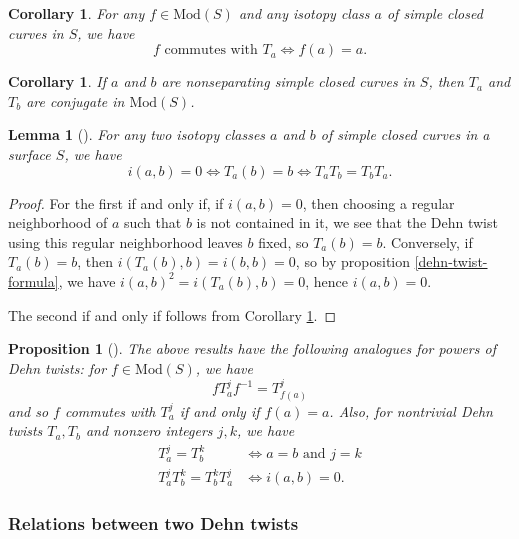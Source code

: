 \documentclass[reqno]{amsart}
\newtheorem{lemma}[theorem]{Lemma}
\newtheorem{proposition}[theorem]{Proposition}
\newtheorem{corollary}[theorem]{Corollary}
\theoremstyle{definition}
\theoremstyle{remark}
\newcommand{\Mod}{{\mathrm{Mod}}}
\begin{document}
\begin{corollary}\label{dehn-commute}
    For any $f \in \Mod(S)$ and any isotopy class $a$ of simple
    closed curves in $S$, we have
    \[
    f \text{ commutes with }T_a \iff
    f(a) = a.
    \] 
\end{corollary}

\begin{corollary}
    If $a$ and $b$ are nonseparating simple closed curves
    in $S$, then $T_a$ and $T_b$ are conjugate in
    $\Mod(S)$.
\end{corollary}

\begin{lemma}[]\label{dehn-intersection-0}
    For any two isotopy classes $a$ and $b$ of simple
    closed curves in a surface $S$, we have
    \[
    i(a,b) = 0 \iff T_a(b) = b \iff
    T_a T_b = T_b T_a.
    \] 
\end{lemma}

\begin{proof}
    For the first if and only if, if $i(a,b) = 0$, then
    choosing a regular neighborhood of $a$ such that
    $b$ is not contained in it, we see that the
    Dehn twist using this regular neighborhood leaves
    $b$ fixed, so $T_a (b) = b$. Conversely, if
    $T_a (b) = b$, then 
    $i \left( T_a(b), b \right) = i(b,b) = 0$, so
    by proposition \ref{dehn-twist-formula}, we have
    $i\left( a,b \right)^2 = 
    i \left( T_a(b), b \right) = 0$, hence
    $i (a,b) = 0$.

    The second if and only if follows from
    Corollary \ref{dehn-commute}.
\end{proof}

\begin{proposition}[]
    The above results have the following analogues for
    powers of Dehn twists:
    for $f \in \Mod(S)$, we have
    \[
    f T_a^{j} f^{-1} = T_{f(a)}^{j}
    \] 
    and so $f$ commutes with $T_a^{j}$ if and only if
    $f(a) = a$. Also, for nontrivial Dehn
    twists $T_a, T_b$ and nonzero integers $j,k$, we have
    \begin{align*}
        T_a^{j} = T_b^{k} &\iff a=b \text{ and } j=k\\
        T_a^{j} T_b^{k} = T_b^{k} T_a^{j} &\iff i(a,b) =0.
    \end{align*}
\end{proposition}


\subsubsection{Relations between two Dehn twists}
\end{document}

